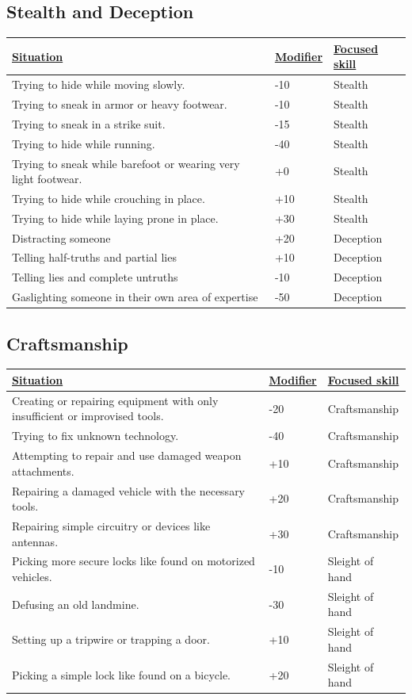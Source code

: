 \subsection{Stealth and Deception}
\begin{tabularx}{\textwidth}{|X|l|l|}
	\hline
	\ul{Situation} & \ul{Modifier} & \ul{Focused skill} \\ \hline
	Trying to hide while moving slowly. & -10 & Stealth \\ \hline
	Trying to sneak in armor or heavy footwear. & -10 & Stealth \\ \hline
	Trying to sneak in a strike suit. & -15 & Stealth \\ \hline
	Trying to hide while running. & -40 & Stealth \\ \hline
	Trying to sneak while barefoot or wearing very light footwear. & +0 & Stealth \\ \hline
	Trying to hide while crouching in place. & +10 & Stealth \\ \hline
	Trying to hide while laying prone in place. & +30 & Stealth \\ \hline
	Distracting someone & +20 & Deception \\ \hline
	Telling half-truths and partial lies & +10 & Deception \\ \hline
	Telling lies and complete untruths & -10 & Deception \\ \hline
	Gaslighting someone in their own area of expertise & -50 & Deception \\ \hline
\end{tabularx}

\subsection{Craftsmanship}
\begin{tabularx}{\textwidth}{|X|l|l|}
	\hline
	\ul{Situation} & \ul{Modifier} & \ul{Focused skill} \\ \hline
	Creating or repairing equipment with only insufficient or improvised tools. & -20 & Craftsmanship \\ \hline
	Trying to fix unknown technology. & -40 & Craftsmanship \\ \hline
	Attempting to repair and use damaged weapon attachments. & +10 & Craftsmanship \\ \hline
	Repairing a damaged vehicle with the necessary tools. & +20 & Craftsmanship \\ \hline
	Repairing simple circuitry or devices like antennas. & +30 & Craftsmanship \\ \hline
	Picking more secure locks like found on motorized vehicles. & -10 & Sleight of hand \\ \hline
	Defusing an old landmine. & -30 & Sleight of hand \\ \hline
	Setting up a tripwire or trapping a door. & +10 & Sleight of hand \\ \hline
	Picking a simple lock like found on a bicycle. & +20 & Sleight of hand \\ \hline
\end{tabularx}
